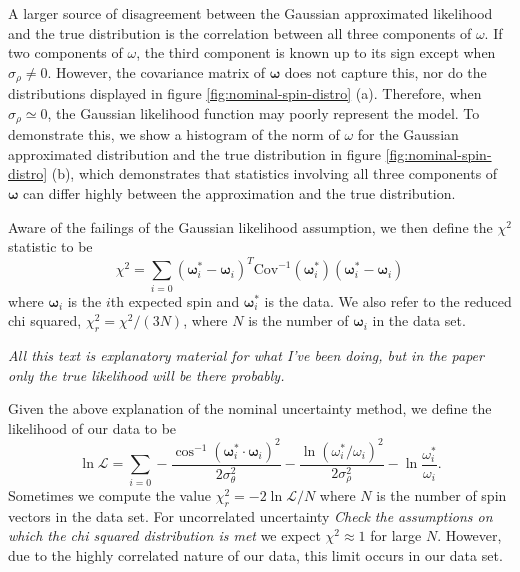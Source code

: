 \documentclass{aastex631}
\newcommand{\parens}[1]{\left( #1 \right)}
\newcommand{\jtd}[1]{{\color{red}\textit{#1}}}
\begin{document}
A larger source of disagreement between the Gaussian approximated likelihood and the true distribution is the correlation between all three components of $\omega$. If two components of $\omega$, the third component is known up to its sign except when $\sigma_\rho \neq 0$. However, the covariance matrix of $\bm \omega$ does not capture this, nor do the distributions displayed in figure \ref{fig:nominal-spin-distro} (a). Therefore, when $\sigma_\rho \simeq 0$, the Gaussian likelihood function may poorly represent the model. To demonstrate this, we show a histogram of the norm of $\omega$ for the Gaussian approximated distribution and the true distribution in figure  \ref{fig:nominal-spin-distro} (b), which demonstrates that statistics involving all three components of $\bm \omega$ can differ highly between the approximation and the true distribution.

Aware of the failings of the Gaussian likelihood assumption, we then define the $\chi^2$ statistic to be
\begin{equation}
\chi^2 = \sum_{i=0} (\bm \omega_i^* - \bm \omega_i)^T\text{Cov}^{-1}(\bm\omega^*_i)(\bm \omega_i^* - \bm \omega_i)
\label{eqn:chisq-nominal}
\end{equation}
where $\bm \omega_i$ is the $i$th expected spin and $\bm \omega_i^*$ is the data. We also refer to the reduced chi squared, $\chi^2_r = \chi^2 / (3N)$, where $N$ is the number of $\bm \omega_i$ in the data set.

\jtd{All this text is explanatory material for what I've been doing, but in the paper only the true likelihood will be there probably.}

Given the above explanation of the nominal uncertainty method, we define the likelihood of our data to be
\begin{equation}
  \ln \mathcal{L} = \sum_{i = 0}-\frac{\cos^{-1} (\bm \omega_i^* \cdot \bm \omega_i)^2}{2\sigma_\theta^2}-\frac{\ln \parens{\omega_i^* /\omega_i}^2}{2\sigma_\rho^2} - \ln\frac{\omega_i^*}{\omega_i}.
  \label{eqn:log-likelihood}
\end{equation}
Sometimes we compute the value $\chi^2_r = -2\ln \mathcal{L} / N$ where $N$ is the number of spin vectors in the data set. For uncorrelated uncertainty \jtd{Check the assumptions on which the chi squared distribution is met} we expect $\chi^2 \approx 1$ for large $N$. However, due to the highly correlated nature of our data, this limit occurs in our data set.
\end{document}
